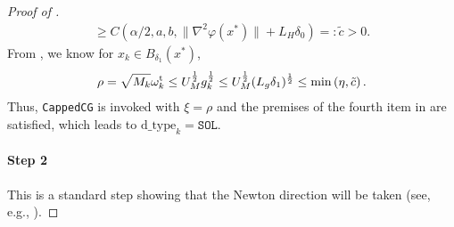 \begin{proof}[Proof of ]
\begin{align*}
    \geq C(\alpha / 2, a, b, \|\nabla^2\varphi(x^*)\| + L_H \delta_0 ) =: \tilde c > 0.
    \end{align*}
    From , 
    we know for $x_k \in B_{\delta_1}(x^*)$, 
    \begin{align*}
        \rho =  
        \sqrt{M_k} \omega_k^{\mathrm{t}}
        \leq U_M^{\frac{1}{2}} g_k^{\frac{1}{2}}
        \leq U_M^{\frac{1}{2}} (L_g \delta_1)^{\frac{1}{2}}
        \leq \min\left( \eta, \tilde c \right).
    \end{align*}
    Thus, \texttt{CappedCG} is invoked with $\xi = \rho$ and the premises of the fourth item in  are satisfied, which leads to $\text{d\_type}_k = \texttt{SOL}$.

    \paragraph{Step 2}
    This is a standard step showing that the Newton direction will be taken (see, e.g., \citet{facchinei1995minimization,facchinei2003finite}).


\end{proof}
